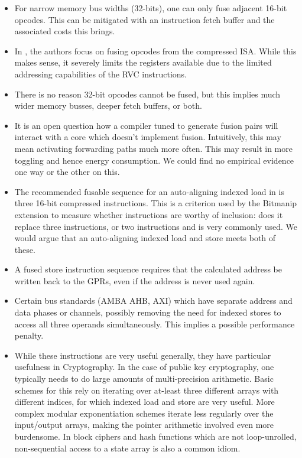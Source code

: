 \begin{itemize}
\item For narrow memory bus widths (32-bits), one can only
    fuse adjacent 16-bit opcodes. This can be mitigated with an
    instruction fetch buffer and the associated costs this brings.

\item In \cite{CDPA:16}, the authors focus on fusing opcodes from the
    compressed ISA. While this makes sense, it severely limits the
    registers available due to the limited addressing capabilities of
    the RVC instructions.

\item There is no reason 32-bit opcodes cannot be fused, but this
    implies much wider memory busses, deeper fetch buffers, or both.

\item It is an open question how a compiler tuned to generate
    fusion pairs will interact with a core which doesn't implement
    fusion. Intuitively, this may mean activating forwarding paths
    much more often. This may result in more toggling and hence
    energy consumption. We could find no empirical evidence one way
    or the other on this.

\item The recommended fusable sequence for an auto-aligning indexed load in
    \cite[Section VI.A]{CDPA:16} is three 16-bit compressed instructions.
    This is a criterion used by the Bitmanip extension to measure whether
    instructions are worthy of inclusion: does it replace three
    instructions, or two instructions and is very commonly used.
    We would argue that an auto-aligning indexed load and store
    meets both of these.

\item A fused store instruction sequence requires that the calculated
    address be written back to the GPRs, even if the address is never
    used again.

\item Certain bus standards (AMBA AHB, AXI) which have separate address and
    data phases or channels, possibly removing the need for indexed stores to
    access all three operands simultaneously.
    This implies a possible performance penalty.

\item While these instructions are very useful generally, they have
    particular usefulness in Cryptography.
    In the case of public key cryptography, one typically needs to do
    large amounts of multi-precision arithmetic.
    Basic schemes for this rely on iterating over at-least three
    different arrays with different indices, for which indexed load
    and store are very useful.
    More complex modular exponentiation schemes iterate less regularly
    over the input/output arrays, making the pointer arithmetic involved
    even more burdensome.
    In block ciphers and hash functions which are not loop-unrolled,
    non-sequential access to a state array is also a common idiom.


\end{itemize}
